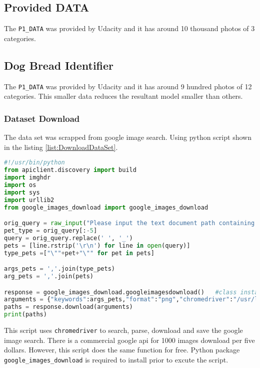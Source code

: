 \documentclass[10pt,journal,compsoc]{IEEEtran}
\begin{document}
\subsection{Provided DATA}

The \verb!P1_DATA! was provided by Udacity and it has around 10 thousand photos of 3 categories.
\subsection{Dog Bread Identifier}

The \verb!P1_DATA! was provided by Udacity and it has around 9 hundred photos of 12 categories. This smaller data reduces the resultant model smaller than others.

\subsubsection{Dataset Download}

The data set was scrapped from google image search. Using python script shown in the listing \ref{list:DownloadDataSet}.

\begin{lstlisting}[language=Python, caption={Python script to download dataset },label={list:DownloadDataSet}]
#!/usr/bin/python
from apiclient.discovery import build
import imghdr
import os
import sys
import urllib2
from google_images_download import google_images_download

orig_query = raw_input("Please input the text document path containing the desired image queries: ")
pet_type = orig_query[:-5]
query = orig_query.replace(' ', '_')
pets = [line.rstrip('\r\n') for line in open(query)]
type_pets =["\""+pet+"\"" for pet in pets]

args_pets = ','.join(type_pets)
arg_pets = ','.join(pets)

response = google_images_download.googleimagesdownload()   #class instantiation
arguments = {"keywords":args_pets,"format":"png","chromedriver":"/usr/lib/chromium-browser/chromedriver","limit":200,"size":"medium","aspect_ratio":"square","print_urls":False}   #creating list of arguments
paths = response.download(arguments)
print(paths)
\end{lstlisting}
This script uses \verb!chromedriver! to search, parse, download and save the google image search. There is a commercial google api for 1000 images download per five dollars. However, this script does the same function for free. Python package \verb!google_images_download! is required to install prior to excute the script.
\end{document}
